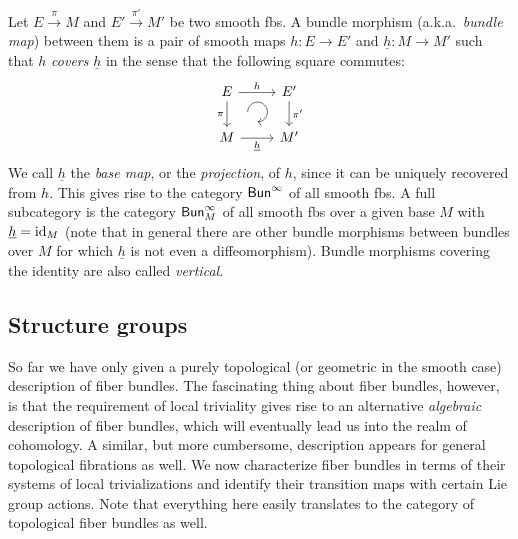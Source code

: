 \begin{defn}
    Let $E\overset{\pi}{\to}M$ and $E'\overset{\pi'}{\to}M'$ be two smooth \glspl{fb}. A bundle morphism (a.k.a.\ \emph{bundle map}) between them is a pair of smooth maps $h:E\to E'$ and $\underline{h}:M\to M'$ such that $h$ \emph{covers} $\underline{h}$ in the sense that the following square commutes:
    \[\begin{tikzcd}[every matrix/.append style={name=m},   
    execute at end picture={\draw [<-] ([xshift=-8mm,yshift=1mm]m-2-2.north) arc[start angle=-90,delta angle=270,radius=0.25cm];}]
       E \arrow[r,"h"]\arrow[d,swap,"\pi"]& E'\arrow[d,"\pi'"] \\
       M\arrow[r,swap,"\underline{h}"]& M'
    \end{tikzcd}\]
    We call $\underline{h}$ the \emph{base map}, or the \emph{projection}, of $h$, since it can be uniquely recovered from $h$.
    This gives rise to the category $\mathsf{Bun}^\infty$ of all smooth \glspl{fb}. A full subcategory is the category $\mathsf{Bun}^\infty_M$ of all smooth \glspl{fb} over a given base $M$ with $\underline{h}=\operatorname{id}_M$ (note that in general there are other bundle morphisms between bundles over $M$ for which $\underline{h}$ is not even a diffeomorphism). Bundle morphisms covering the identity are also called \emph{vertical}.
\end{defn}








\subsection{Structure groups}\label{sec: structure groups}

So far we have only given a purely topological (or geometric in the smooth case) description of fiber bundles. The fascinating thing about fiber bundles, however, is that the requirement of local triviality gives rise to an alternative \emph{algebraic} description of fiber bundles, which will eventually lead us into the realm of cohomology. A similar, but more cumbersome, description appears for general topological fibrations as well. We now characterize fiber bundles in terms of their systems of local trivializations and identify their transition maps with certain Lie group actions. Note that everything here easily translates to the category of topological fiber bundles as well.


